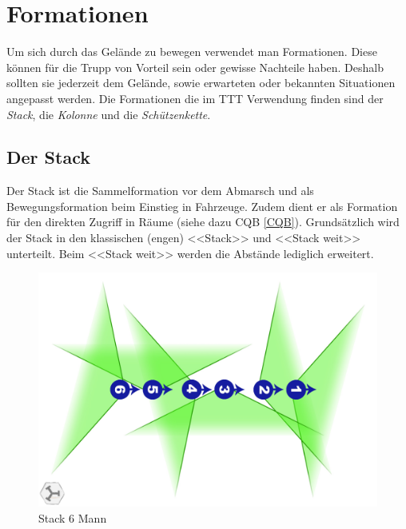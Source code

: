 \section{Formationen}
Um sich durch das Gelände zu bewegen verwendet man Formationen. Diese können für die Trupp von Vorteil sein oder gewisse Nachteile haben. Deshalb sollten sie jederzeit dem Gelände, sowie erwarteten oder bekannten Situationen angepasst werden. Die Formationen die im TTT Verwendung finden sind der \textit{Stack}, die \textit{Kolonne} und die \textit{Schützenkette}. 

\subsection{Der Stack}
Der Stack ist die Sammelformation vor dem Abmarsch und als Bewegungsformation beim Einstieg in Fahrzeuge. Zudem dient er als Formation für den direkten Zugriff in Räume (siehe dazu CQB \autoref{CQB}). Grundsätzlich wird der Stack in den klassischen (engen) <<Stack>> und <<Stack weit>> unterteilt. Beim <<Stack weit>> werden die Abstände lediglich erweitert.
\begin{figure}[h]
	\centering
	\includegraphics[width=0.7\linewidth]{./img/grundlagen/formationen/stack_6mann.jpg}
	\caption{Stack 6 Mann}
\end{figure}\\

